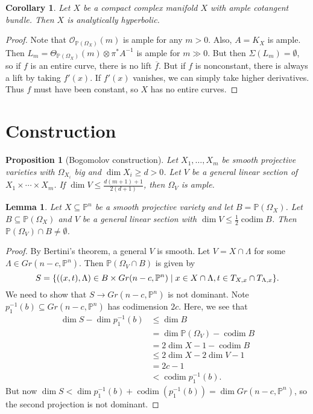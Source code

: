 \documentclass[leqno, openany]{memoir}
\newtheorem{cor}[thm]{Corollary}
\newtheorem{prop}[thm]{Proposition}
\newtheorem{lem}[thm]{Lemma}
\theoremstyle{definition}
\theoremstyle{remark}
\theoremstyle{plain}
\theoremstyle{definition}
\theoremstyle{remark}
\renewcommand{\P}{\mathbb{P}}
\newcommand{\mc}[1]{\mathcal{#1}}
\newcommand{\on}[1]{\operatorname{#1}}
\newcommand{\ol}[1]{\overline{#1}}
\begin{document}
\begin{cor}
    Let $X$ be a compact complex manifold $X$ with ample cotangent bundle. Then $X$ is analytically hyperbolic.
\end{cor}

\begin{proof}
    Note that $\mc{O}_{\P(\Omega_X)}(m)$ is ample for any $m > 0$. Also, $A = K_X$ is ample. Then $L_m = \Theta_{\P(\Omega_X)}(m) \otimes \pi^* A^{-1}$ is ample for $m \gg 0$. But then $\Sigma(L_m) = \emptyset$, so if $f$ is an entire curve, there is no lift $\ol{f}$. But if $f$ is nonconstant, there is always a lift by taking $f'(x)$. If $f'(x)$ vanishes, we can simply take higher derivatives. Thus $f$ must have been constant, so $X$ has no entire curves.
\end{proof}

\section{Construction}

\begin{prop}[Bogomolov construction]
    Let $X_1, \ldots, X_m$ be smooth projective varieties with $\Omega_{X_i}$ big and $\dim X_i \geq d > 0$. Let $V$ be a general linear section of $X_1 \times \cdots \times X_m$. If $\dim V \leq \frac{d(m+1)+1}{2(d+1)}$, then $\Omega_V$ is ample.
\end{prop}

\begin{lem}
    Let $X \subseteq \P^n$ be a smooth projective variety and let $B = \P(\Omega_X)$. Let $B \subseteq \P(\Omega_X)$ and $V$ be a general linear section with $\dim V \leq \frac{1}{2} \on{codim} B$. Then $\P(\Omega_V) \cap B \neq \emptyset$.
\end{lem}

\begin{proof}
    By Bertini's theorem, a general $V$ is smooth. Let $V = X \cap \Lambda$ for some $\Lambda \in Gr(n-c, \P^n)$. Then $\P(\Omega_V \cap B)$ is given by
    \[ S = \qty{((x,t), \Lambda) \in B \times Gr(n-c, \P^n) \mid x \in X \cap \Lambda, t \in T_{X,x} \cap T_{\Lambda, x}}. \]
    We need to show that $S \to Gr(n-c, \P^n)$ is not dominant. Note $p_1^{-1}(b) \subseteq Gr(n-c, \P^n)$ has codimension $2c$. Here, we see that
    \begin{align*}
        \dim S - \dim p_1^{-1}(b) &\leq \dim B \\
        &= \dim \P(\Omega_V) - \on{codim} B \\
        &= 2 \dim X - 1 - \on{codim} B \\
        &\leq 2 \dim X - 2 \dim V - 1 \\
        &= 2c-1 \\
        &< \on{codim} p_1^{-1}(b).
    \end{align*}
    But now $\dim S < \dim p_1^{-1}(b) + \on{codim}(p_1^{-1}(b)) = \dim Gr(n-c, \P^n)$, so the second projection is not dominant.
\end{proof}
\end{document}
